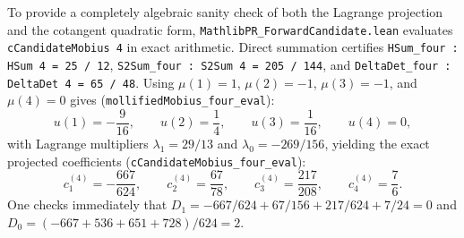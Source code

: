 \documentclass[11pt,a4paper]{article}
\theoremstyle{definition}
\begin{document}
To provide a completely algebraic sanity check of both the Lagrange projection and the cotangent quadratic form, \texttt{MathlibPR\_\allowbreak ForwardCandidate.lean} evaluates \texttt{cCandidateMobius 4} in exact arithmetic. Direct summation certifies \texttt{HSum\_four : HSum 4 = 25 / 12}, \texttt{S2Sum\_four : S2Sum 4 = 205 / 144}, and \texttt{DeltaDet\_four : DeltaDet 4 = 65 / 48}. Using $\mu(1) = 1$, $\mu(2) = -1$, $\mu(3) = -1$, and $\mu(4) = 0$ gives (\texttt{mollifiedMobius\_four\_eval}):
\begin{equation}
u(1) = -\frac{9}{16}, \qquad u(2) = \frac{1}{4}, \qquad u(3) = \frac{1}{16}, \qquad u(4) = 0,
\end{equation}
with Lagrange multipliers $\lambda_1 = 29/13$ and $\lambda_0 = -269/156$, yielding the exact projected coefficients (\texttt{cCandidateMobius\_four\_eval}):
\begin{equation}
c_1^{(4)} = -\frac{667}{624}, \qquad c_2^{(4)} = \frac{67}{78}, \qquad c_3^{(4)} = \frac{217}{208}, \qquad c_4^{(4)} = \frac{7}{6}.
\end{equation}
One checks immediately that $D_1 = -667/624 + 67/156 + 217/624 + 7/24 = 0$ and $D_0 = (-667 + 536 + 651 + 728)/624 = 2$.
\end{document}
